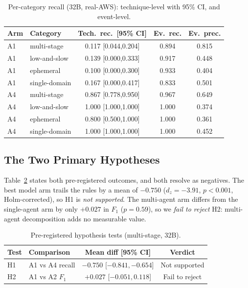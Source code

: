 \documentclass[journal]{IEEEtran}
\begin{document}
\begin{table}[t]
\caption{Per-category recall (32B, real-AWS): technique-level with 95\% CI, and event-level.}
\label{tab:percat}
\centering
\small
\begin{tabular}{llccc}
\toprule
Arm & Category & Tech.\ rec.\ [95\% CI] & Ev.\ rec. & Ev.\ prec. \\
\midrule
A1 & multi-stage   & 0.117 [0.044,0.204] & 0.894 & 0.815 \\
A1 & low-and-slow  & 0.139 [0.000,0.333] & 0.917 & 0.448 \\
A1 & ephemeral     & 0.100 [0.000,0.300] & 0.933 & 0.404 \\
A1 & single-domain & 0.167 [0.000,0.417] & 0.833 & 0.501 \\
A4 & multi-stage   & 0.867 [0.778,0.950] & 0.967 & 0.649 \\
A4 & low-and-slow  & 1.000 [1.000,1.000] & 1.000 & 0.374 \\
A4 & ephemeral     & 0.800 [0.500,1.000] & 1.000 & 0.361 \\
A4 & single-domain & 1.000 [1.000,1.000] & 1.000 & 0.452 \\
\bottomrule
\end{tabular}
\end{table}

\subsection{The Two Primary Hypotheses}
Table~\ref{tab:hyp} states both pre-registered outcomes, and both resolve as negatives. The best
model arm trails the rules by a mean of $-0.750$ ($d_z=-3.91$, $p<0.001$, Holm-corrected), so H1 is
\emph{not supported}. The multi-agent arm differs from the single-agent arm by only $+0.027$ in $F_1$
($p=0.59$), so we \emph{fail to reject} H2: multi-agent decomposition adds no measurable value.

\begin{table}[t]
\caption{Pre-registered hypothesis tests (multi-stage, 32B).}
\label{tab:hyp}
\centering
\small
\begin{tabular}{llcc}
\toprule
Test & Comparison & Mean diff [95\% CI] & Verdict \\
\midrule
H1 & A1 vs A4 recall & $-0.750$ [$-0.841,-0.654$] & Not supported \\
H2 & A1 vs A2 $F_1$  & $+0.027$ [$-0.051,0.118$]  & Fail to reject \\
\bottomrule
\end{tabular}
\end{table}
\end{document}
